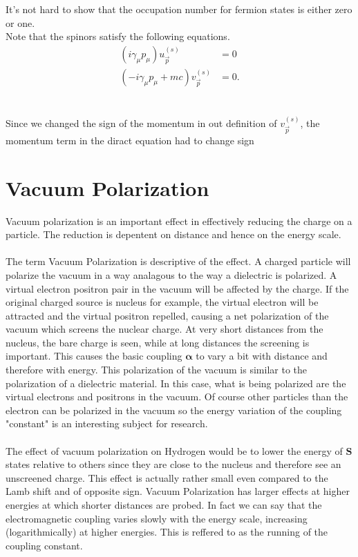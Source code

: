 \documentclass{report}
\begin{document}
It's not hard to show that the occupation number for fermion states is either zero or one.
\\
Note that the spinors satisfy the following equations.
\begin{align*}
	\left( i \gamma_{\mu}p_{\mu} \right) u^{(s)}_{\vec{p}}       & = 0 \\
	\left( -i \gamma_{\mu}p_{\mu} + mc \right) v^{(s)}_{\vec{p}} & = 0
	.\end{align*}
\\
\\
Since we changed the sign of the momentum in out definition of $\displaystyle v^{(s)}_{\vec{p}}$, the momentum term in the diract equation had to change sign


\section{Vacuum Polarization}
Vacuum polarization is an important effect in effectively reducing the charge on a particle. The reduction is depentent on distance and hence on the energy scale.
\\
\\
The term Vacuum Polarization is descriptive of the effect. A charged particle will polarize the vacuum in a way analagous to the way a dielectric is polarized. A virtual electron positron pair in the vacuum will be affected by the charge. If the original charged source is nucleus for example, the virtual electron will be attracted and the virtual positron repelled, causing a net polarization of the vacuum which screens the nuclear charge. At very short distances from the nucleus, the bare charge is seen, while at long distances the screening is important. This causes the basic coupling $\displaystyle \mathbf{\alpha}$ to vary a bit with distance and therefore with energy. This polarization of the vacuum is similar to the polarization of a dielectric material. In this case, what is being polarized are the virtual electrons and positrons in the vacuum. Of course other particles than the electron can be polarized in the vacuum so the energy variation of the coupling "constant" is an interesting subject for research.
\\
\\
The effect of vacuum polarization on Hydrogen would be to lower the energy of $\displaystyle \mathbf{S}$ states relative to others since they are close to the nucleus and therefore see an unscreened charge. This effect is actually rather small even compared to the Lamb shift and of opposite sign. Vacuum Polarization has larger effects at higher energies at which shorter distances are probed. In fact we can say that the electromagnetic coupling varies slowly with the energy scale, increasing (logarithmically) at higher energies.  This is reffered to as the running of the coupling constant.
\end{document}
